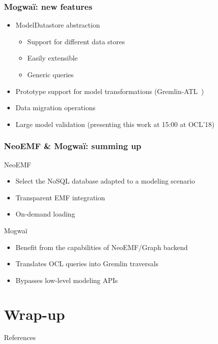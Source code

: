 \begin{frame}[c]\frametitle{Mogwa\"i: new features}
\begin{itemize}
	\item ModelDatastore abstraction
		\begin{itemize}
		\item Support for different data stores
		\item Easily extensible
		\item Generic queries
		\end{itemize}
	\item Prototype support for model transformations (Gremlin-ATL~\cite{daniel2017gremlin})
	\item Data migration operations
	\item Large model validation (presenting this work at 15:00 at OCL'18)
\end{itemize}

\end{frame}



\begin{frame}[c]\frametitle{NeoEMF \& Mogwa\"i: summing up}
	\begin{block}{NeoEMF}
	  \begin{itemize}
		\item Select the NoSQL database adapted to a modeling scenario
		\item Transparent EMF integration
		\item On-demand loading
	  \end{itemize}
	\end{block}

  \begin{block}{Mogwa\"i}
		\begin{itemize}
		\item Benefit from the capabilities of NeoEMF/Graph backend
		\item Translates OCL queries into Gremlin traversals
		\item Bypasses low-level modeling APIs
	  \end{itemize}
  \end{block}
\end{frame}

\section{Wrap-up}

\begin{frame}[allowframebreaks]{References}
  
  
\end{frame}


